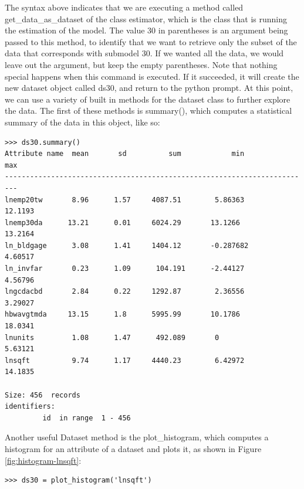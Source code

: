 The syntax above indicates that we are executing a method
called get\_data\_as\_dataset of the class estimator, which
is the class that is running the estimation of the model.
The value 30 in parentheses is an argument being passed to
this method, to identify that we want to retrieve only the
subset of the data that corresponds with submodel 30.  If we
wanted all the data, we would leave out the argument, but
keep the empty parentheses.  Note that nothing special
happens when this command is executed.  If it succeeded, it
will create the new dataset object called ds30, and return
to the python prompt.  At this point, we can use a variety
of built in methods for the dataset class to further explore
the data.  The first of these methods is summary(), which
computes a statistical summary of the data in this object,
like so:
\\

\begin{verbatim}
>>> ds30.summary()
Attribute name	mean       sd	       sum            min             max
-------------------------------------------------------------------------
lnemp20tw       8.96      1.57     4087.51        5.86363       12.1193
lnemp30da      13.21      0.01     6024.29       13.1266        13.2164
ln_bldgage      3.08      1.41     1404.12       -0.287682       4.60517
ln_invfar       0.23      1.09      104.191      -2.44127        4.56796
lngcdacbd       2.84      0.22     1292.87        2.36556        3.29027
hbwavgtmda     13.15      1.8      5995.99       10.1786        18.0341
lnunits         1.08      1.47      492.089       0              5.63121
lnsqft          9.74      1.17     4440.23        6.42972       14.1835

Size: 456  records
identifiers: 
         id  in range  1 - 456
\end{verbatim}


Another useful Dataset method is the plot\_histogram, which
computes a histogram for an attribute of a dataset and plots
it, as shown in Figure \ref{fig:histogram-lnsqft}:
\\

\begin{verbatim}
>>> ds30 = plot_histogram('lnsqft')
\end{verbatim}

